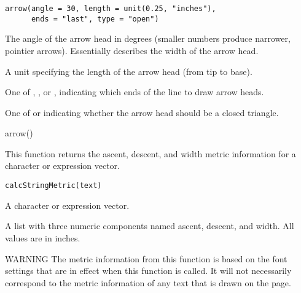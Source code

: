 %
\begin{Usage}
\begin{verbatim}
arrow(angle = 30, length = unit(0.25, "inches"),
      ends = "last", type = "open")
\end{verbatim}
\end{Usage}
%
\begin{Arguments}
\begin{ldescription}
\item[\code{angle}] The angle of the arrow head in degrees (smaller numbers
produce narrower, pointier arrows).  Essentially describes
the width of the arrow head.
\item[\code{length}] A unit specifying the length of the arrow head (from tip
to base).
\item[\code{ends}] One of , , or ,
indicating which ends of the line to draw arrow heads.
\item[\code{type}] One of  or  indicating
whether the arrow head should be a closed triangle.
\end{ldescription}
\end{Arguments}
%
\begin{Examples}
\begin{ExampleCode}
arrow()
\end{ExampleCode}
\end{Examples}
%
\begin{Description}\relax
This function returns the ascent, descent, and width metric
information for a character or expression vector.
\end{Description}
%
\begin{Usage}
\begin{verbatim}
calcStringMetric(text)
\end{verbatim}
\end{Usage}
%
\begin{Arguments}
\begin{ldescription}
\item[\code{text}]  A character or expression vector. 
\end{ldescription}
\end{Arguments}
%
\begin{Value}
A list with three numeric components named ascent, descent, and width.
All values are in inches.
\end{Value}
%
\begin{Section}{WARNING }
 The metric information from this function is based
on the font settings that are in effect when this function is called.
It will not necessarily correspond to the metric information of any
text that is drawn on the page.
\end{Section}
